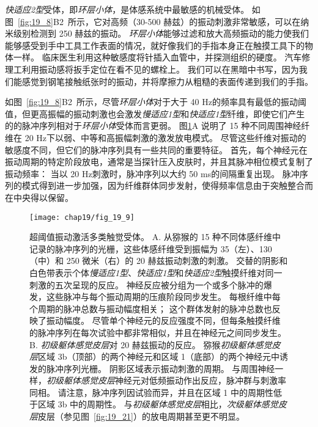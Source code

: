 \textit{快适应2型}受体，即\textit{环层小体}，是体感系统中最敏感的机械受体。
如图~\ref{fig:19_8}B2~所示，它对高频（30-500 赫兹）的振动刺激非常敏感，可以在纳米级别检测到 250 赫兹的振动。
\textit{环层小体}能够过滤和放大高频振动的能力使我们能够感受到手中工具工作表面的情况，就好像我们的手指本身正在触摸工具下的物体一样。
临床医生利用这种敏感度将针插入血管中，并探测组织的硬度。
汽车修理工利用振动感将扳手定位在看不见的螺栓上。
我们可以在黑暗中书写，因为我们能感觉到钢笔接触纸张时的振动，并将摩擦力从粗糙的表面传递到我们的手指。


如图~\ref{fig:19_8}B2~所示，尽管\textit{环层小体}对于大于 40 Hz的频率具有最低的振动阈值，但更高振幅的振动刺激也会激发\textit{慢适应1型}和\textit{快适应1型}纤维，即使它们产生的的脉冲序列相对于\textit{环层小体}受体而言更弱。
图\ref{fig:19_9}A 说明了 15 种不同周围神经纤维在 20 Hz下以弱、中等和高振幅刺激的激发放电模式。
尽管这些纤维对振动的敏感度不同，但它们的脉冲序列具有一些共同的重要特征。
首先，每个神经元在振动周期的特定阶段放电，通常是当探针压入皮肤时，并且其脉冲相位模式复制了振动频率：
当以 20 Hz刺激时，脉冲序列以大约 50 ms的间隔重复出现。
脉冲序列的模式得到进一步加强，因为纤维群体同步发射，使得频率信息由于突触整合而在中央得以保留。


\begin{figure}[htbp]
	\centering
	\texttt{[image: chap19/fig\_19\_9]}
	\caption{超阈值振动激活多类触觉受体。 
		A. 从猕猴的 15 种不同体感纤维中记录的脉冲序列的光栅，这些体感纤维受到振幅为 35（左）、130（中）和 250 微米（右）的 20 赫兹振动刺激的刺激。
		交替的阴影和白色带表示个体\textit{慢适应1型}、\textit{快适应1型}和\textit{快适应2型}触摸纤维对同一刺激的五次呈现的反应。
		神经反应被分组为一个或多个脉冲的爆发，这些脉冲与每个振动周期的压痕阶段同步发生。
		每根纤维中每个周期的脉冲总数与振动幅度相关； 这个群体发射的脉冲总数也反映了振动幅度。
		尽管单个神经元的反应强度不同，但每条触摸纤维的脉冲序列在每次试验中都非常相似，并且在神经元之间同步发生\cite{muniak2007neural}。
		B. \textit{初级躯体感觉皮层}对 20 赫兹振动的反应。
		猕猴\textit{初级躯体感觉皮层}区域 3b（顶部）的两个神经元和区域 1（底部）的两个神经元中诱发的脉冲序列光栅。
		阴影区域表示振动刺激的周期。
		与周围神经一样，\textit{初级躯体感觉皮层}神经元对低频振动作出反应，脉冲群与刺激率同相。
		请注意，脉冲序列因试验而异，并且在区域 1 中的周期性低于区域 3b 中的周期性。
		与\textit{初级躯体感觉皮层}相比，\textit{次级躯体感觉皮层}皮层（参见图~\ref{fig:19_21}）的放电周期甚至更不明显\cite{salinas2000periodicity}。}
	\label{fig:19_9}
\end{figure}


